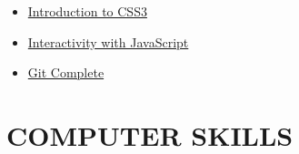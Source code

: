\documentclass[10pt,a4paper,sans]{moderncv} %
\begin{document}
\begin{itemize}
\begin{multicols}{2}
\begin{itemize}
				\item  {} \href{https://www.coursera.org/learn/introcss}{Introduction to CSS3} 
				
				\item  {} \href{https://www.coursera.org/learn/javascript}{Interactivity with JavaScript}  
				
				\item  {\large{}} \href{https://www.udemy.com/git-complete/learn/v4/overview}{Git Complete}
				
			\end{itemize}
		\end{multicols}
		
		
	\end{itemize}
	
	\section{COMPUTER SKILLS}
	
\end{document}
